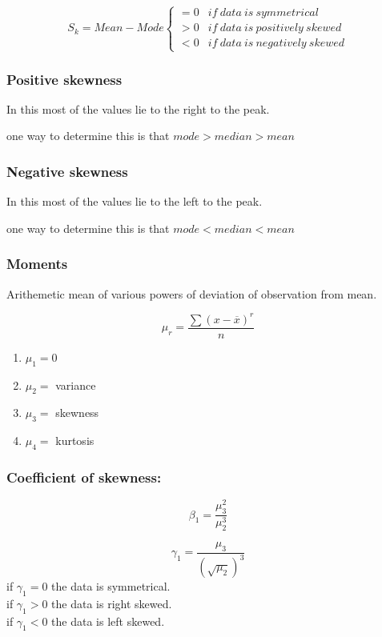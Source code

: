 \documentclass[11pt,letterpaper]{article}
\begin{document}
\[
  S_k = Mean - Mode
  \begin{cases}
    = 0 & if\ data\ is\ symmetrical\\
    > 0 & if\ data\ is\ positively\ skewed\\
    < 0 & if\ data\ is\ negatively\ skewed
  \end{cases}
\]

\subsubsection{Positive skewness}
In this most of the values lie to the right to the peak. 

one way to determine this is that $mode > median > mean$ 


\subsubsection{Negative skewness}
In this most of the values lie to the left to the peak. 

one way to determine this is that $mode < median < mean$ 

\subsubsection{Moments}
Arithemetic mean of various powers of deviation of observation from mean. 

\[
  \mu_r = \frac{\sum(x-\overline{x})^r}{n}
\]

\begin{enumerate}
  \item $\mu_1 = 0$
  \item $\mu_2 = $ variance
  \item $\mu_3 = $ skewness
  \item $\mu_4 = $ kurtosis
\end{enumerate}

\subsubsection{Coefficient of skewness:}
\[
  \beta_1 = \frac{\mu_3^2}{\mu_2^3}
\]

\[
  \gamma_1 = \frac{\mu_3}{(\sqrt{\mu_2})^3}
\]
if $\gamma_1 = 0$ the data is symmetrical. \\
if $\gamma_1 > 0$ the data is right skewed. \\
if $\gamma_1 < 0$ the data is left skewed. \\
\end{document}
